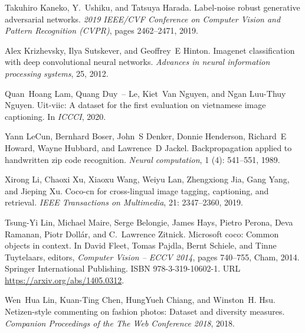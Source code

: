 \documentclass{bmvc2k}
\begin{document}
\begin{thebibliography}{63}
Takuhiro Kaneko, Y.~Ushiku, and Tatsuya Harada.
\newblock Label-noise robust generative adversarial networks.
\newblock \emph{2019 IEEE/CVF Conference on Computer Vision and Pattern
  Recognition (CVPR)}, pages 2462--2471, 2019.

Alex Krizhevsky, Ilya Sutskever, and Geoffrey~E Hinton.
\newblock Imagenet classification with deep convolutional neural networks.
\newblock \emph{Advances in neural information processing systems}, 25, 2012.

Quan~Hoang Lam, Quang Duy~– Le, Kiet~Van Nguyen, and Ngan Luu-Thuy Nguyen.
\newblock Uit-viic: A dataset for the first evaluation on vietnamese image
  captioning.
\newblock In \emph{ICCCI}, 2020.

Yann LeCun, Bernhard Boser, John~S Denker, Donnie Henderson, Richard~E Howard,
  Wayne Hubbard, and Lawrence~D Jackel.
\newblock Backpropagation applied to handwritten zip code recognition.
\newblock \emph{Neural computation}, 1 (4): 541--551, 1989.

Xirong Li, Chaoxi Xu, Xiaoxu Wang, Weiyu Lan, Zhengxiong Jia, Gang Yang, and
  Jieping Xu.
\newblock Coco-cn for cross-lingual image tagging, captioning, and retrieval.
\newblock \emph{IEEE Transactions on Multimedia}, 21: 2347--2360,
  2019.

Tsung-Yi Lin, Michael Maire, Serge Belongie, James Hays, Pietro Perona, Deva
  Ramanan, Piotr Doll{\'a}r, and C.~Lawrence Zitnick.
\newblock Microsoft coco: Common objects in context.
\newblock In David Fleet, Tomas Pajdla, Bernt Schiele, and Tinne Tuytelaars,
  editors, \emph{Computer Vision -- ECCV 2014}, pages 740--755, Cham, 2014.
  Springer International Publishing.
\newblock ISBN 978-3-319-10602-1.
\newblock URL \url{https://arxiv.org/abs/1405.0312}.

Wen~Hua Lin, Kuan-Ting Chen, HungYueh Chiang, and Winston~H. Hsu.
\newblock Netizen-style commenting on fashion photos: Dataset and diversity
  measures.
\newblock \emph{Companion Proceedings of the The Web Conference 2018}, 2018.


\end{thebibliography}
\end{document}
